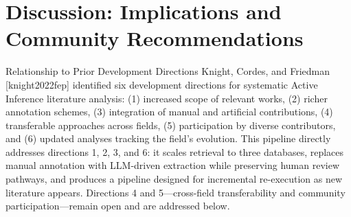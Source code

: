 \documentclass[
  ignorenonframetext,
]{beamer}
\author{\texorpdfstring{}{}}
\date{}
\providecommand{\citep}[1]{[#1]}
\begin{document}
\section{\texorpdfstring{Discussion: Implications and Community
Recommendations
\label{sec:discussion}}{Discussion: Implications and Community Recommendations }}\label{discussion-implications-and-community-recommendations}

\begin{frame}[allowframebreaks]{Relationship to Prior Development
Directions}
\protect{}\label{relationship-to-prior-development-directions}
Knight, Cordes, and Friedman \citep{knight2022fep} identified six
development directions for systematic Active Inference literature
analysis: (1) increased scope of relevant works, (2) richer annotation
schemes, (3) integration of manual and artificial contributions, (4)
transferable approaches across fields, (5) participation by diverse
contributors, and (6) updated analyses tracking the field's evolution.
This pipeline directly addresses directions 1, 2, 3, and 6: it scales
retrieval to three databases, replaces manual annotation with LLM-driven
extraction while preserving human review pathways, and produces a
pipeline designed for incremental re-execution as new literature
appears. Directions 4 and 5---cross-field transferability and community
participation---remain open and are addressed below.
\end{frame}
\end{document}
